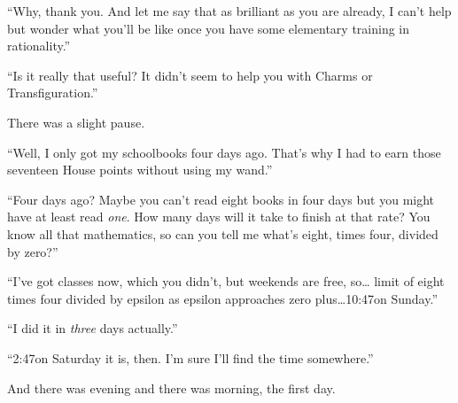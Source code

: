“Why, thank you. And let me say that as brilliant as you are already, I can’t help but wonder what you’ll be like once you have some elementary training in rationality.”

“Is it really that useful? It didn’t seem to help you with Charms or Transfiguration.”

There was a slight pause.

“Well, I only got my schoolbooks four days ago. That’s why I had to earn those seventeen House points without using my wand.”

“Four days ago? Maybe you can’t read eight books in four days but you might have at least read \emph{one}. How many days will it take to finish at that rate? You know all that mathematics, so can you tell me what’s eight, times four, divided by zero?”

“I’ve got classes now, which you didn’t, but weekends are free, so… limit of eight times four divided by epsilon as epsilon approaches zero plus…10:47\am on Sunday.”

“I did it in \emph{three} days actually.”

“2:47\pm on Saturday it is, then. I’m sure I’ll find the time somewhere.”

And there was evening and there was morning, the first day.

